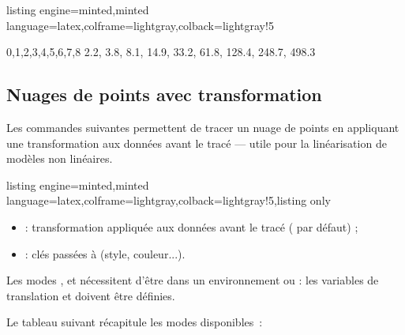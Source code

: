 \documentclass[11pt,a4paper]{ltxdoc}
\begin{document}
\begin{tcblisting}{listing engine=minted,minted language=latex,colframe=lightgray,colback=lightgray!5}
\begin{GraphiqueTikzSemiLog}%
    [x=1.5cm,y=1.5cm,Xmin=0,Xmax=8,Ymin=1,Ymax=1000,Xgrille=1,Xgrilles=0.5]
  \TracerNuageSemiLog
  {0,1,2,3,4,5,6,7,8}%
  {2.2, 3.8, 8.1, 14.9, 33.2, 61.8, 128.4, 248.7, 498.3}
\end{GraphiqueTikzSemiLog}
\end{tcblisting}

\pagebreak

\subsection{Nuages de points avec transformation}\label{nuagetransfo}

Les commandes suivantes permettent de tracer un nuage de points en appliquant
une transformation aux données avant le tracé — utile pour la linéarisation
de modèles non linéaires.

\begin{tcblisting}{listing engine=minted,minted language=latex,colframe=lightgray,colback=lightgray!5,listing only}
\end{tcblisting}

\begin{itemize}
  \item {} : transformation appliquée aux données
  avant le tracé ( par défaut) ;
  \item {} : clés passées à  (style, couleur...).
\end{itemize}

\begin{tcolorbox}[colframe=orange,colback=orange!5]
Les modes ,  et  nécessitent d'être dans un environnement  ou 
: les variables de translation  et  doivent être définies.
\end{tcolorbox}

Le tableau suivant récapitule les modes disponibles~:
\end{document}
